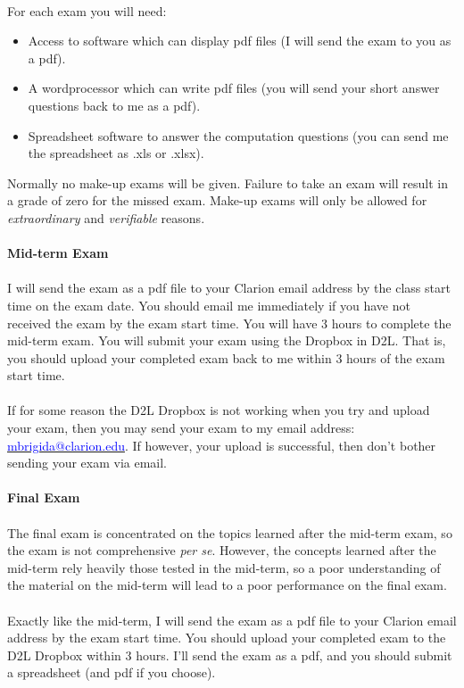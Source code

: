 \documentclass{article}
\begin{document}
\\
For each exam you will need:
\begin{itemize}
\item  Access to software which can display pdf files (I will send the exam to you as a pdf).
\item  A wordprocessor which can write pdf files (you will send your short answer questions back to me as a pdf).
\item Spreadsheet software to answer the computation questions (you can send me the spreadsheet as .xls or .xlsx).
\end{itemize}  
Normally no make-up exams will be given.  Failure to take an exam will result in a grade of zero for the missed exam.  Make-up exams will only be allowed for {\it extraordinary} and {\it verifiable} reasons.\\
\\
{\bf Mid-term Exam}\\
\\
I will send the exam as a pdf file to your Clarion email address by the class start time on the exam date.  You should email me immediately if you have not received the exam by the exam start time. You will have 3 hours to complete the mid-term exam.  You will submit your exam using the Dropbox in D2L.  That is, you should upload your completed exam back to me within 3 hours of the exam start time.\\
\\
If for some reason the D2L Dropbox is not working when you try and upload your exam, then you may send your exam to my email address:\\  \href{mailto:mbrigida@clarion.edu}{\textcolor{blue}{mbrigida@clarion.edu}}.  If however, your upload is successful, then don't bother sending your exam via email.\\  
\\
{\bf Final Exam}\\
\\
The final exam is concentrated on the topics learned after the mid-term exam, so the exam is not comprehensive {\it per se}.  However, the concepts learned after the mid-term rely heavily those tested in the mid-term, so a poor understanding of the material on the mid-term will lead to a poor performance on the final exam. \\
\\
Exactly like the mid-term, I will send the exam as a pdf file to your Clarion email address by the exam start time.  You should upload your completed exam to the D2L Dropbox within 3 hours.  I'll send the exam as a pdf, and you should submit a spreadsheet (and pdf if you choose).\\
\end{document}
